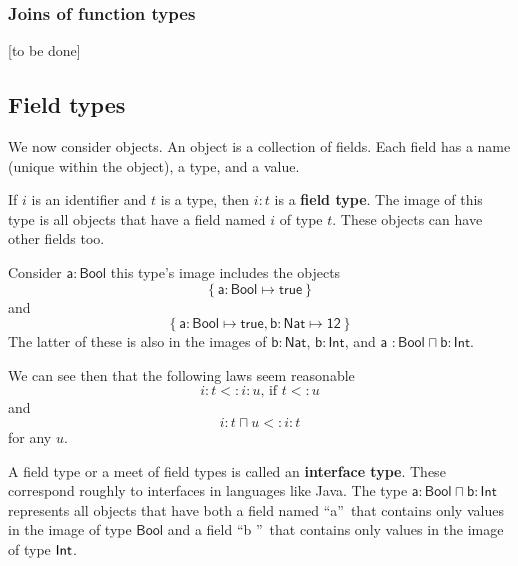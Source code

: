 \documentclass[12pt]{article}
\begin{document}
\subsubsection{Joins of function types}

[to be done]

\subsection{Field types}

We now consider objects. An object is a collection of fields. Each field has
a name (unique within the object), a type, and a value.

If $i$ is an identifier and $t$ is a type, then $i\colon t$ is a \textbf{%
field type}. The image of this type is all objects that have a field named $%
i $ of type $t$. These objects can have other fields too.

Consider $\mathsf{a\colon Bool}$ this type's image includes the objects%
\begin{equation*}
\left\{ \mathsf{a\colon Bool}\mapsto \mathsf{true}\right\}
\end{equation*}%
and%
\begin{equation*}
\left\{ \mathsf{a\mathsf{\colon Bool}\mapsto true},\mathsf{b\mathsf{\colon }%
Nat\mapsto 12}\right\}
\end{equation*}%
The latter of these is also in the images of $\mathsf{b}$\textsf{$\colon $}$%
\mathsf{Nat}$, $\mathsf{b}$\textsf{$\colon $}$\mathsf{Int}$, and $\mathsf{a}$%
\textsf{$\colon $}$\mathsf{Bool\sqcap b}$\textsf{$\colon $}$\mathsf{Int}$.

We can see then that the following laws seem reasonable 
\begin{equation*}
i\colon t<:i\colon u\text{, if }t<:u
\end{equation*}%
and 
\begin{equation*}
i\colon t\sqcap u<:i\colon t
\end{equation*}%
for any $u$.

A field type or a meet of field types is called an \textbf{interface type}.
These correspond roughly to interfaces in languages like Java. The type $%
\mathsf{a}$\textsf{$\colon $}$\mathsf{Bool\sqcap b}$\textsf{$\colon $}$%
\mathsf{Int}$ represents all objects that have both a field named
\textquotedblleft \textsf{a}\textquotedblright\ that contains only values in
the image of type $\mathsf{Bool}$ and a field \textquotedblleft \textsf{b}%
\textquotedblright\ that contains only values in the image of type $\mathsf{%
Int}$.
\end{document}
